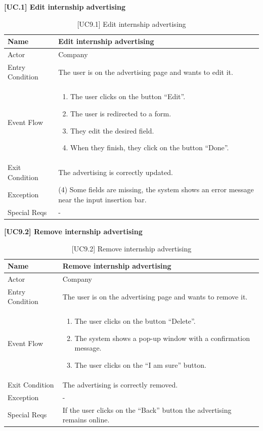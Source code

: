 \textbf{[UC\nextUseCases.1] Edit internship advertising}
\begin{table}[H] %
    \centering
    \begin{tabular}{|p{3cm}|p{10cm}|}
    \hline
    Name & Edit internship advertising \\ \hline
    Actor  & Company \\ \hline
    Entry Condition  & The user is on the advertising page and wants to edit it. \\ \hline
    Event Flow  & 
    \begin{enumerate}[noitemsep, topsep=0pt]
        \item The user clicks on the button “Edit”.
        \item The user is redirected to a form.
        \item They edit the desired field.
        \item When they finish, they click on the button “Done”.
    \end{enumerate}
    \\ \hline
    Exit Condition  & The advertising is correctly updated. \\ \hline
    Exception  & (4) Some fields are missing, the system shows an error message near the input insertion bar. \\ \hline
    Special Reqs  & - \\ \hline
    \end{tabular}
    \caption{[UC9.1] Edit internship advertising}
\end{table}

\textbf{[UC9.2] Remove internship advertising}
\begin{table}[H] %
    \centering
    \begin{tabular}{|p{3cm}|p{10cm}|}
    \hline
    Name & Remove internship advertising \\ \hline
    Actor  & Company \\ \hline
    Entry Condition  & The user is on the advertising page and wants to remove it. \\ \hline
    Event Flow  & 
    \begin{enumerate}[noitemsep, topsep=0pt]
        \item The user clicks on the button “Delete”.
        \item The system shows a pop-up window with a confirmation message.
        \item The user clicks on the “I am sure” button.
    \end{enumerate}
    \\ \hline
    Exit Condition  & The advertising is correctly removed. \\ \hline
    Exception  & - \\ \hline
    Special Reqs  & If the user clicks on the “Back” button the advertising remains online. \\ \hline
    \end{tabular}
    \caption{[UC9.2] Remove internship advertising}
\end{table}

